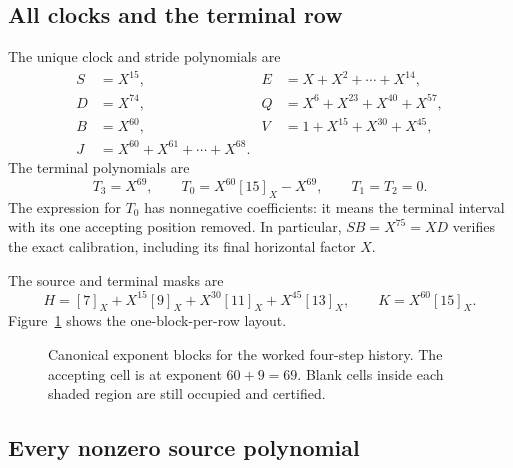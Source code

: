 \documentclass[11pt,letterpaper]{article}
\numberwithin{equation}{section}
\theoremstyle{definition}
\newcommand{\rep}[1]{[#1]_X}
\begin{document}
\subsection{All clocks and the terminal row}

The unique clock and stride polynomials are
\begin{align*}
 S&=X^{15},&E&=X+X^2+\cdots+X^{14},\\
 D&=X^{74},&Q&=X^6+X^{23}+X^{40}+X^{57},\\
 B&=X^{60},&V&=1+X^{15}+X^{30}+X^{45},\\
 J&=X^{60}+X^{61}+\cdots+X^{68}.
\end{align*}
The terminal polynomials are
\[
 T_3=X^{69},\qquad T_0=X^{60}\rep{15}-X^{69},\qquad T_1=T_2=0.
\]
The expression for $T_0$ has nonnegative coefficients: it means the
terminal interval with its one accepting position removed. In particular,
$SB=X^{75}=XD$ verifies the exact calibration, including its final
horizontal factor $X$.

The source and terminal masks are
\[
 H=\rep7+X^{15}\rep9+X^{30}\rep{11}+X^{45}\rep{13},
 \qquad K=X^{60}\rep{15}.
\]
Figure~\ref{pwh:oc:fig:blocks} shows the one-block-per-row layout.

\begin{figure}[ht]
\centering
{}
\caption{Canonical exponent blocks for the worked four-step history.
The accepting cell is at exponent $60+9=69$. Blank cells inside each
shaded region are still occupied and certified.}
\label{pwh:oc:fig:blocks}
\end{figure}

\subsection{Every nonzero source polynomial}
\end{document}
